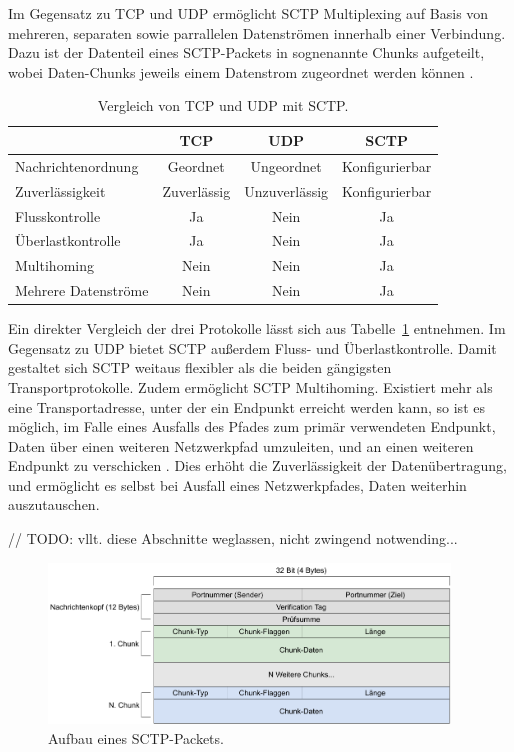 \vspace{11pt}

Im Gegensatz zu \acs{TCP} und \acs{UDP} ermöglicht \acs{SCTP} Multiplexing auf Basis von mehreren, separaten sowie parrallelen Datenströmen innerhalb einer Verbindung. Dazu ist der Datenteil eines \acs{SCTP}-Packets in sognenannte \glqq{}Chunks\grqq{}  aufgeteilt, wobei Daten-Chunks jeweils einem Datenstrom zugeordnet werden können \cite{sctpRFC}.\par

\begin{table}[ht]
\centering
\begin{tabular}[t]{lccc}
\toprule
&TCP&UDP&SCTP\\
\midrule
Nachrichtenordnung&Geordnet&Ungeordnet&Konfigurierbar\\
Zuverlässigkeit&Zuverlässig&Unzuverlässig&Konfigurierbar\\
Flusskontrolle&Ja&Nein&Ja\\
Überlastkontrolle &Ja&Nein&Ja\\
Multihoming&Nein&Nein&Ja\\
Mehrere Datenströme&Nein&Nein&Ja\\
\bottomrule
\end{tabular}
\caption{Vergleich von \acs{TCP} und \acs{UDP} mit \acs{SCTP}.}
\label{table:vergleichNetzwerkProtokolle}
\end{table}

Ein direkter Vergleich der drei Protokolle lässt sich aus Tabelle~\ref{table:vergleichNetzwerkProtokolle} entnehmen. Im Gegensatz zu \acs{UDP} bietet \acs{SCTP} außerdem Fluss- und Überlastkontrolle. Damit gestaltet sich \acs{SCTP} weitaus flexibler als die beiden gängigsten Transportprotokolle. Zudem ermöglicht \acs{SCTP} Multihoming. Existiert mehr als eine Transportadresse, unter der ein Endpunkt erreicht werden kann, so ist es möglich, im Falle eines Ausfalls des Pfades zum primär verwendeten Endpunkt, Daten über einen weiteren Netzwerkpfad umzuleiten, und an einen weiteren Endpunkt zu verschicken \cite{sctpRFC, multihoming}. Dies erhöht die Zuverlässigkeit der Datenübertragung, und ermöglicht es selbst bei Ausfall eines Netzwerkpfades, Daten weiterhin auszutauschen.\par

\color{red}
// TODO: vllt. diese Abschnitte weglassen, nicht zwingend notwending...

\begin{figure}[h]
\centering
\includegraphics[width=0.95\textwidth]{bilder/PDF_SVG/SCTP_PACKET.pdf}
\caption{Aufbau eines \acs{SCTP}-Packets.}
\label{fig:sctpPacket}
\end{figure}

